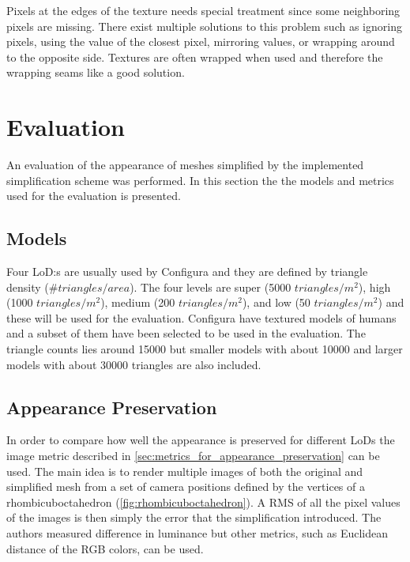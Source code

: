  Pixels at the edges of the texture needs special treatment since some neighboring pixels are missing. There exist multiple solutions to this problem such as ignoring pixels, using the value of the closest pixel, mirroring values, or wrapping around to the opposite side. Textures are often wrapped when used and therefore the wrapping seams like a good solution.

 
\clearpage

  


\section{Evaluation} \label{sec:evaluation}
An evaluation of the appearance of meshes simplified by the implemented simplification scheme was performed. In this section the the models and metrics used for the evaluation is presented.

\subsection{Models}
Four LoD:s are usually used by Configura and they are defined by triangle density ($\#triangles/area$). The four levels are super (5000 $triangles/m^2$), high (1000 $triangles/m^2$), medium (200 $triangles/m^2$), and low  (50 $triangles/m^2$) and these will be used for the evaluation. Configura have textured models of humans and a subset of them have been selected to be used in the evaluation. The triangle counts lies around 15000 but smaller models with about 10000 and larger models with about 30000 triangles are also included. 

\subsection{Appearance Preservation}
In order to compare how well the appearance is preserved for different LoDs the image metric described in \cref{sec:metrics_for_appearance_preservation} can be used. The main idea is to render multiple images of both the original and simplified mesh from a set of camera positions defined by the vertices of a rhombicuboctahedron (\cref{fig:rhombicuboctahedron}). A RMS of all the pixel values of the images is then simply the error that the simplification introduced. The authors \cite{lindstrom2000image} measured difference in luminance but other metrics, such as Euclidean distance of the RGB colors, can be used.



